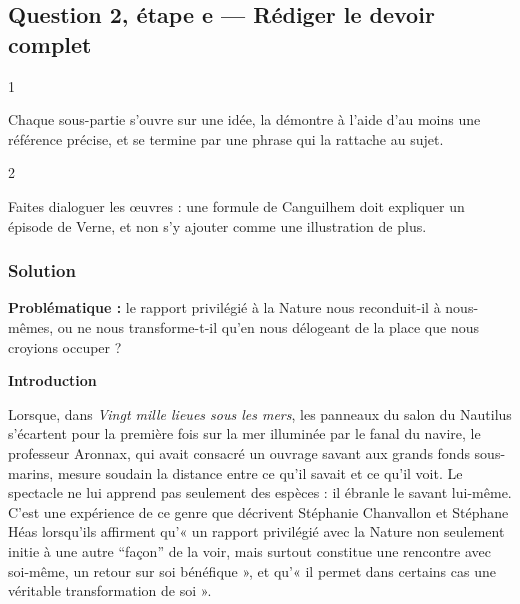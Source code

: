 \documentclass[11pt,a4paper]{article}
\begin{document}
\hypertarget{question-2-uxe9tape-e-ruxe9diger-le-devoir-complet}{%
\subsection{Question 2, étape e --- Rédiger le devoir complet}\label{question-2-uxe9tape-e-ruxe9diger-le-devoir-complet}}

\begin{indication}{1}

Chaque sous-partie s'ouvre sur une idée, la démontre à l'aide d'au moins une référence précise, et se termine par une phrase qui la rattache au sujet.

\end{indication}

\begin{indication}{2}

Faites dialoguer les œuvres : une formule de Canguilhem doit expliquer un épisode de Verne, et non s'y ajouter comme une illustration de plus.

\end{indication}

\hypertarget{solution-7}{%
\subsubsection{Solution}\label{solution-7}}

\textbf{Problématique :} le rapport privilégié à la Nature nous reconduit-il à nous-mêmes, ou ne nous transforme-t-il qu'en nous délogeant de la place que nous croyions occuper ?

\textbf{Introduction}

Lorsque, dans \emph{Vingt mille lieues sous les mers}, les panneaux du salon du Nautilus s'écartent pour la première fois sur la mer illuminée par le fanal du navire, le professeur Aronnax, qui avait consacré un ouvrage savant aux grands fonds sous-marins, mesure soudain la distance entre ce qu'il savait et ce qu'il voit. Le spectacle ne lui apprend pas seulement des espèces : il ébranle le savant lui-même. C'est une expérience de ce genre que décrivent Stéphanie Chanvallon et Stéphane Héas lorsqu'ils affirment qu'« un rapport privilégié avec la Nature non seulement initie à une autre ``façon'' de la voir, mais surtout constitue une rencontre avec soi-même, un retour sur soi bénéfique », et qu'« il permet dans certains cas une véritable transformation de soi ».
\end{document}

